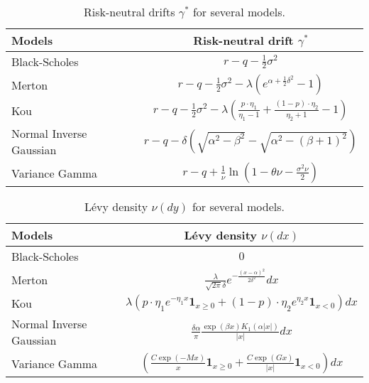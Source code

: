 \begin{table}[!ht]
\centering
  \begin{tabular}{l|c}
    \toprule
    Models & Risk-neutral drift $\gamma^\ast$ \\
    \toprule
   Black-Scholes & $r-q-\frac{1}{2}\sigma^2$ \\
   \midrule
   Merton & $r-q -\frac{1}{2}\sigma^2 - \lambda\left(e^{\alpha+\frac{1}{2}\delta^2}-1\right)$\\
   Kou & $r-q- \frac{1}{2}\sigma^2 -\lambda \left(\frac{p\cdot\eta_1}{\eta_1-1}+\frac{(1-p)\cdot\eta_2}{\eta_2+1}-1\right)$\\
   \midrule
   Normal Inverse Gaussian & $r-q -\delta \left(\sqrt{\alpha^2-\beta^2}-\sqrt{\alpha^2-(\beta+1)^2}\right) $\\
   Variance Gamma &$r-q + \frac{1}{\nu}\ln\left(1-\theta\nu-\frac{\sigma^2\nu}{2}\right)$ \\
    \bottomrule
  \end{tabular}
  \vspace{5pt}
  \caption{\label{tab:rn_drift} Risk-neutral drifts $\gamma^\ast$ for several models.}
\end{table}

\begin{table}[!ht]
\centering
  \begin{tabular}{l|c}
    \toprule
    Models & L\'evy density $\nu(dx)$ \\
    \toprule
   Black-Scholes & $0$ \\
   \midrule
   Merton & $\frac{\lambda}{\sqrt{2\pi}\delta}e^{-\frac{(x-\alpha)^2}{2\delta^2}}dx$\\
   Kou & $\lambda\left(p\cdot\eta_1e^{-\eta_1 x} \mathbf{1}_{x\geq0}+(1-p)\cdot\eta_2e^{\eta_2x}\mathbf{1}_{x<0}\right)dx$\\
   \midrule
   Normal Inverse Gaussian & $\frac{\delta \alpha}{\pi}\frac{\exp(\beta x)K_1(\alpha|x|)}{|x|}dx $\\
   Variance Gamma & $\left(\frac{C\exp(-Mx)}{x}\mathbf{1}_{x\geq0}+\frac{C\exp(Gx)}{|x|}\mathbf{1}_{x<0}\right)dx $ \\
    \bottomrule
  \end{tabular}
  \vspace{5pt}
  \caption{\label{tab:density} L\'evy density $\nu(dy)$ for several models.}
\end{table}

